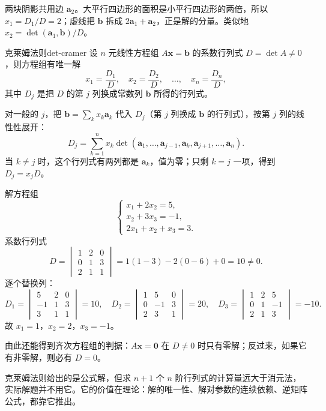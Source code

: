 两块阴影共用边 $\boldsymbol{a}_2$。大平行四边形的面积是小平行四边形的两倍，所以 $x_1=D_1/D=2$；虚线把 $\boldsymbol{b}$ 拆成 $2\boldsymbol{a}_1+\boldsymbol{a}_2$，正是解的分量。类似地 $x_2=\det(\boldsymbol{a}_1,\boldsymbol{b})/D$。

\begin{conclusion}{克莱姆法则}{det-cramer}
设 $n$ 元线性方程组 $A\boldsymbol{x}=\boldsymbol{b}$ 的系数行列式 $D=\det A\neq0$，则方程组有唯一解
\[
x_1=\frac{D_1}{D},\quad x_2=\frac{D_2}{D},\quad\ldots,\quad x_n=\frac{D_n}{D},
\]
其中 $D_j$ 是把 $D$ 的第 $j$ 列换成常数列 $\boldsymbol{b}$ 所得的行列式。
\end{conclusion}

对一般的 $j$，把 $\boldsymbol{b}=\sum_k x_k\boldsymbol{a}_k$ 代入 $D_j$（第 $j$ 列换成 $\boldsymbol{b}$ 的行列式），按第 $j$ 列的线性性展开：
\[
D_j=\sum_{k=1}^{n}x_k\det(\boldsymbol{a}_1,\ldots,\boldsymbol{a}_{j-1},\boldsymbol{a}_k,\boldsymbol{a}_{j+1},\ldots,\boldsymbol{a}_n).
\]
当 $k\neq j$ 时，这个行列式有两列都是 $\boldsymbol{a}_k$，值为零；只剩 $k=j$ 一项，得到 $D_j=x_jD$。

解方程组
\[
\begin{cases}
x_1+2x_2=5,\\
x_2+3x_3=-1,\\
2x_1+x_2+x_3=3.
\end{cases}
\]
系数行列式
\[
D=\begin{vmatrix}1&2&0\\0&1&3\\2&1&1\end{vmatrix}
=1(1-3)-2(0-6)+0=10\neq0.
\]
逐个替换列：
\[
D_1=\begin{vmatrix}5&2&0\\-1&1&3\\3&1&1\end{vmatrix}=10,\quad
D_2=\begin{vmatrix}1&5&0\\0&-1&3\\2&3&1\end{vmatrix}=20,\quad
D_3=\begin{vmatrix}1&2&5\\0&1&-1\\2&1&3\end{vmatrix}=-10.
\]
故 $x_1=1$，$x_2=2$，$x_3=-1$。

由此还能得到齐次方程组的判据：$A\boldsymbol{x}=\boldsymbol{0}$ 在 $D\neq0$ 时只有零解；反过来，如果它有非零解，则必有 $D=0$。

克莱姆法则给出的是公式解，但求 $n+1$ 个 $n$ 阶行列式的计算量远大于消元法，实际解题并不用它。它的价值在理论：解的唯一性、解对参数的连续依赖、逆矩阵公式，都靠它推出。

